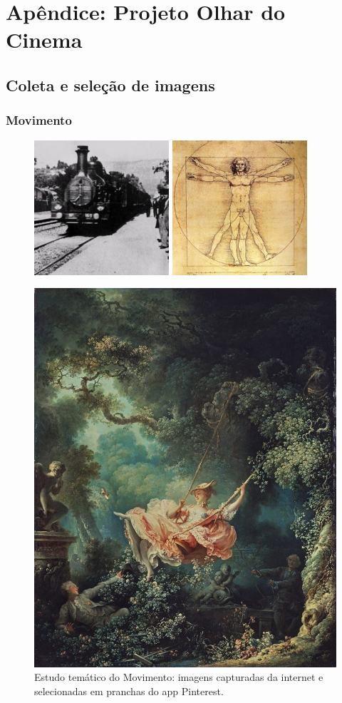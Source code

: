 \chapter{Apêndice: Projeto Olhar do Cinema}

\section{Coleta e seleção de imagens}

\subsection*{Movimento}

\begin{figure}
  \caption[Estudo temático do Movimento]{Estudo temático do Movimento: imagens capturadas da internet e selecionadas em pranchas do \ac{app} Pinterest.}
	\centering
	\includegraphics[height = 5cm]{apendice/movimento/olhar-do-cinema-movimento2.pdf}
	\hfill
	\includegraphics[height = 5cm]{apendice/movimento/olhar-do-cinema-movimento4.pdf}\par

	\par\vspace{3em}
	\includegraphics[width = .35\linewidth]{apendice/movimento/olhar-do-cinema-movimento1.pdf}
\end{figure}

